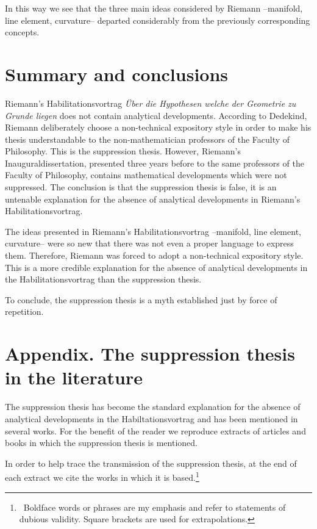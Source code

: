 \documentclass[12pt]{article}
\begin{document}
In this way we see that the three main ideas considered by Riemann --manifold, line element, curvature-- departed considerably from the previously corresponding concepts.

\section{Summary and conclusions}

Riemann's Habilitationsvortrag {\it \"Uber die Hypothesen welche der Geometrie zu Grunde liegen} does not contain analytical developments. According to Dedekind, Riemann deliberately choose a non-technical expository style in order to make his thesis understandable to the non-mathematician professors of the Faculty of Philosophy. This is the suppression thesis. However, Riemann's Inauguraldissertation, presented three years before to the same professors of the Faculty of Philosophy, contains mathematical developments which were not suppressed. The conclusion is that the suppression thesis is false, it is an untenable explanation for the absence of analytical developments in Riemann's Habilitationsvortrag. 

The ideas presented in Riemann's Habilitationsvortrag --manifold, line element, curvature-- were so new that there was not even a proper language to express them. Therefore, Riemann was forced to adopt a non-technical expository style. This is a more credible explanation for the absence of analytical developments in the Habilitationsvortrag than the suppression thesis.

To conclude, the suppression thesis is a myth established just by force of repetition.

\section*{Appendix. The suppression thesis in the literature}

The suppression thesis has become the standard explanation for the absence of analytical developments in the Habiltationsvortrag and has been mentioned in several works. For the benefit of the reader we reproduce extracts of articles and books in which the suppression thesis is mentioned.

In order to help trace the transmission of the suppression thesis, at the end of each extract we cite the works in which it is based.\footnote{\ Boldface words or phrases are my emphasis and refer to statements of dubious validity. Square brackets are used for extrapolations.}
\end{document}
